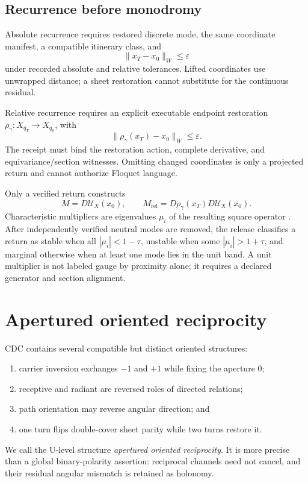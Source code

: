 \documentclass[11pt]{article}
\newcommand{\Uop}{\mathcal{U}}
\newcommand{\eps}{\varepsilon}
\begin{document}
\subsection{Recurrence before monodromy}

Absolute recurrence requires restored discrete mode, the same coordinate
manifest, a compatible itinerary class, and
\begin{equation}
\lVert x_T-x_0\rVert_W\leq\eps
\label{eq:absolute-return}
\end{equation}
under recorded absolute and relative tolerances. Lifted coordinates use
unwrapped distance; a sheet restoration cannot substitute for the continuous
residual.

Relative recurrence requires an explicit executable endpoint restoration
$\rho_\gamma:X_{q_T}\to X_{q_0}$, with
\begin{equation}
\lVert\rho_\gamma(x_T)-x_0\rVert_W\leq\eps.
\label{eq:relative-return}
\end{equation}
The receipt must bind the restoration action, complete derivative, and
equivariance/section witnesses. Omitting changed coordinates is only a projected
return and cannot authorize Floquet language.

Only a verified return constructs
\begin{equation}
M=D\Uop_X(x_0),\qquad
M_{\mathrm{rel}}=D\rho_\gamma(x_T)D\Uop_X(x_0).
\label{eq:monodromy}
\end{equation}
Characteristic multipliers are eigenvalues $\mu_i$ of the resulting square
operator \cite{dacunha2009}. After independently verified neutral modes are
removed, the release classifies a return as stable when all
$|\mu_i|<1-\tau$, unstable when some $|\mu_i|>1+\tau$, and marginal otherwise
when at least one mode lies in the unit band. A unit multiplier is not labeled
gauge by proximity alone; it requires a declared generator and section
alignment.

\section{Apertured oriented reciprocity}

CDC contains several compatible but distinct oriented structures:
\begin{enumerate}
\item carrier inversion exchanges $-1$ and $+1$ while fixing the aperture $0$;
\item receptive and radiant are reversed roles of directed relations;
\item path orientation may reverse angular direction; and
\item one turn flips double-cover sheet parity while two turns restore it.
\end{enumerate}
We call the U-level structure \emph{apertured oriented reciprocity}. It is more
precise than a global binary-polarity assertion: reciprocal channels need not
cancel, and their residual angular mismatch is retained as holonomy.
\end{document}
